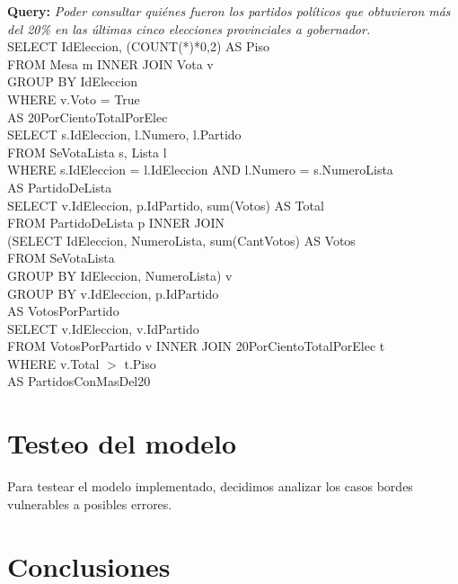 \documentclass[10pt,a4paper]{article}
\begin{document}
\textbf{Query:} \textit{Poder consultar quiénes fueron los partidos políticos que obtuvieron más del 20\% en las últimas cinco elecciones provinciales a gobernador.}\\

SELECT IdEleccion, (COUNT(*)*0,2) AS Piso\\
FROM Mesa m INNER JOIN Vota v\\
GROUP BY IdEleccion\\
WHERE v.Voto = True\\
AS 20PorCientoTotalPorElec\\

SELECT s.IdEleccion, l.Numero, l.Partido\\
FROM SeVotaLista s, Lista l\\
WHERE s.IdEleccion = l.IdEleccion AND l.Numero = s.NumeroLista\\
AS PartidoDeLista\\

SELECT v.IdEleccion, p.IdPartido, sum(Votos) AS Total\\
FROM PartidoDeLista p INNER JOIN\\
(SELECT IdEleccion, NumeroLista, sum(CantVotos) AS Votos\\
FROM SeVotaLista\\
GROUP BY IdEleccion, NumeroLista) v\\
GROUP BY v.IdEleccion, p.IdPartido\\
AS VotosPorPartido\\

SELECT v.IdEleccion, v.IdPartido\\
FROM VotosPorPartido v INNER JOIN 20PorCientoTotalPorElec t\\
WHERE v.Total $>$ t.Piso\\
AS PartidosConMasDel20\\

\newpage
\section{Testeo del modelo}
Para testear el modelo implementado, decidimos analizar los casos bordes vulnerables a posibles errores.



\newpage
\section{Conclusiones}
\end{document}
